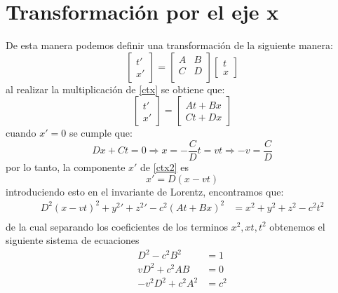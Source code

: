 \documentclass[12pt,letterpaper]{report}
\begin{document}
\section*{Transformación por el eje x}
De esta manera podemos definir una transformación de la siguiente manera:
\begin{equation}
    \begin{bmatrix}
        {t}'\\
        x' 
    \end{bmatrix}= 
    \begin{bmatrix}
        A & B \\
        C & D\\
    \end{bmatrix} \begin{bmatrix}
        t \\
        x
    \end{bmatrix}
    \label{ctx}
\end{equation}
al realizar la multiplicación de \ref{ctx} se obtiene que:
\begin{equation}
    \begin{bmatrix}
        {t}' \\
        {x}'
    \end{bmatrix} = 
    \begin{bmatrix}
        At+Bx \\
        Ct+Dx 
    \end{bmatrix}
    \label{ctx2}
\end{equation}
cuando $x'=0$ se cumple que:
\begin{equation}
    D x + C t =0 \Rightarrow x= -\frac{C}{D} t =vt \Rightarrow -v = \frac{C}{D}
    \label{c}
\end{equation}
por lo tanto, la componente $x'$ de \ref{ctx2} es 
\begin{equation}
    x'= D(x-vt)
\end{equation}
introduciendo esto en el invariante de Lorentz, encontramos que:
\begin{align*}
    D^2(x-vt)^2 + {y^2}' + {z^2}' - c^2(At+Bx)^2 &= x^2 + y^2 +z^2 -c^2 t^2 \\
\end{align*}
de la cual separando los coeficientes de los terminos $x^2 , xt , t^2$ obtenemos el siguiente sistema de ecuaciones
\begin{align}
    \label{d2}
    D^2-c^2B^2 &= 1\\
    \label{vd^2}
    v D^2 + c^2 AB &= 0\\
    \label{v2d2}
    -v^2 D^2 +c^2 A^2&= c^2
\end{align}
\end{document}
